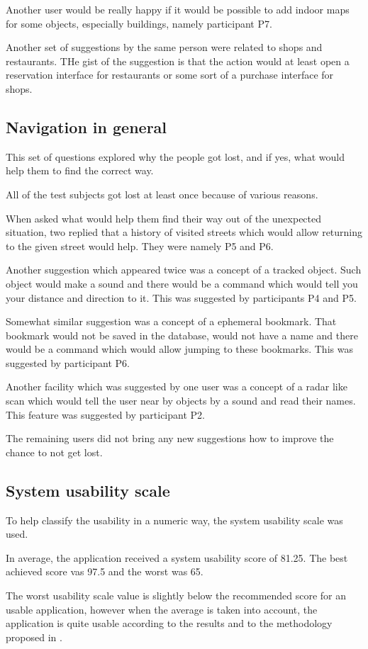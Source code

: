 \documentclass[nolof,digital]{fithesis3}
\begin{document}
Another user would be really happy if it would be possible to add indoor maps for some objects, especially buildings, namely participant P7.

Another  set of suggestions by the same person were related to shops and restaurants. THe gist of the suggestion is that the action would at least open a reservation interface for restaurants or some sort of a purchase interface for shops.
\subsection{Navigation in general}
This set of questions explored why the people got lost, and if yes, what would help them to find the correct way.

All of the test subjects got lost at least once because of various reasons.

When asked what would help them find their way out of the unexpected situation, two replied that a history of visited streets which would allow returning to the given street would help. They were namely P5 and P6.

Another suggestion which appeared twice was a concept of a tracked object. Such object would make a sound and there would be a command which would tell you your distance and direction to it. This was suggested by participants P4 and P5.

Somewhat similar suggestion was a concept of a ephemeral bookmark. That bookmark would not be saved in the database, would not have a name and there would be a command which would allow jumping to these bookmarks. This was suggested by participant P6.

Another facility which was suggested by one user was a concept of a radar like scan which would tell the user near by objects by a sound and read their names. This feature was suggested by participant P2.

The  remaining users did not bring any new suggestions how to improve the chance to not get lost.
\subsection{System usability scale}
To help classify the usability in a numeric way, the system usability scale was used.

In average, the application received a system usability score of 81.25. The best achieved score vas 97.5 and the worst was 65.

The worst usability scale value is slightly below the recommended score for an usable application, however when the average is taken into account, the application is quite usable according to the results and to the methodology proposed in \parencite{SauroJeff2012Qtue}.
\end{document}
